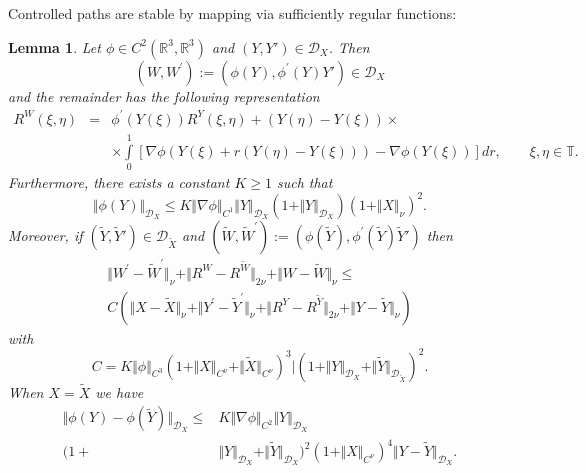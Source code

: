\documentclass[11pt,a4paper,reqno]{amsart}%
\theoremstyle{plain}
\theoremstyle{remark}
\theoremstyle{plain}
\newtheorem{lemma}[theorem]{Lemma}
\numberwithin{equation}{section}
\def\Rnu{{\mathbb R}}
\def\intl{\int\limits}
\begin{document}
Controlled paths are stable by mapping via sufficiently regular functions:
\begin{lemma}\label{lem:RegularMap}
Let $\phi\in C^2(\Rnu^3,\Rnu^3)$ and $(Y,Y')\in \mathcal{D}_X$.
Then
\begin{equation}
(W,W^\prime):=(\phi(Y),\phi^\prime(Y)Y')\in
\mathcal{D}_X\label{eqn:RegularMap-1}
\end{equation}
and the remainder has the following representation
\begin{eqnarray}
R^{W}(\xi,\eta)&=&\phi^\prime(Y(\xi))R^Y(\xi,\eta)+
(Y(\eta)-Y(\xi))\times
\nonumber
\\&& \times\intl_0^1[\nabla\phi(Y(\xi)+r(Y(\eta)-Y(\xi)))-\nabla\phi(Y(\xi))]dr,\qquad\xi,\eta\in
\mathbb{T}.
\label{eqn:RegularMap-2}
\end{eqnarray}
Furthermore, there exists a
constant $K\geq 1$ such that
\begin{equation}
\Vert \phi(Y)\Vert_{\mathcal{D}_X}\leq
K\Vert \nabla\phi\Vert_{C^1}\Vert Y\Vert_{\mathcal{D}_X}(1+\Vert Y\Vert_{\mathcal{D}_X})(1+\Vert X\Vert_{\nu})^2.\label{eqn:RegularMap-3}
\end{equation}
Moreover, if $(\tilde{Y},\tilde{Y}')\in \mathcal{D}_{\tilde{X}}$
and
$
(\tilde{W},\tilde{W}^\prime):=(\phi(\tilde{Y}),\phi^\prime(\tilde{Y})\tilde{Y}')
$
then
\begin{equation}
\begin{split}
\label{eqn:RegularMap-4}
\Vert W^\prime-\tilde{W}^\prime\Vert_{\nu}+\Vert R^W-R^{\tilde{W}}\Vert_{2\nu}+\Vert W-\tilde{W}\Vert_{\nu}\leq\\
C(\Vert X-\tilde{X}\Vert_{\nu}+\Vert Y^\prime-\tilde{Y}^\prime\Vert_{\nu}+\Vert R^Y-R^{\tilde{Y}}\Vert_{2\nu}+\Vert Y-\tilde{Y}\Vert_{\nu})
\end{split}
\end{equation}
with
\begin{equation}
C=K\Vert \phi\Vert_{C^3}(1+\Vert X\Vert_{C^{\nu}}+\Vert \tilde{X}\Vert_{C^{\nu}})^3\vert (1+\Vert Y\Vert_{\mathcal{D}_X}+\Vert \tilde{Y}\Vert_{\mathcal{D}_{\tilde{X}}})^2.\label{eqn:RegularMap-4'}
\end{equation}
When $X=\tilde{X}$ we have
\begin{equation}
\label{eqn:RegularMap-4''}
\begin{split}
\Vert \phi(Y)-\phi(\tilde{Y})\Vert_{\mathcal{D}_X}\leq
& K\Vert \nabla\phi\Vert_{C^2}\Vert Y\Vert_{\mathcal{D}_X}\\
(1+&\Vert Y\Vert_{\mathcal{D}_X}+\Vert \tilde{Y}\Vert_{\mathcal{D}_X})^2(1+\Vert X\Vert_{C^{\nu}})^4
\Vert Y-\tilde{Y}\Vert_{\mathcal{D}_X}.
\end{split}
\end{equation}
\end{lemma}
\end{document}
